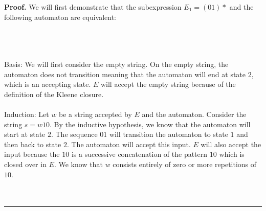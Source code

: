 \documentclass{article}%
\newenvironment{proof}[1][Proof]{\noindent\textbf{#1.} }{\ \rule{0.5em}{0.5em}}
\begin{document}
\begin{proof}
    We will first demonstrate that the subexpression $E_1=(01)*$ and the following automaton are equivalent:\\
    \\
    \begin{center}
    \end{center}\\
    \\
    Basis: We will first consider the empty string. On the empty string, the automaton does not transition meaning that the
    automaton will end at state $2$, which is an accepting state. $E$ will accept the empty string because
    of the definition of the Kleene closure.\\
    \\
    Induction: Let $w$ be a string accepted by $E$ and the automaton. Consider the string $s=w10$. By the inductive hypothesis,
    we know that the automaton will start at state $2$. The sequence $01$ will transition the automaton to state $1$ and then
    back to state $2$. The automaton will accept this input. $E$ will also accept the input because the $10$ is a successive
    concatenation of the pattern $10$ which is closed over in $E$. We know that $w$ consists entirely of zero or more repetitions
    of $10$.\\
    \\
\end{proof}
\end{document}
